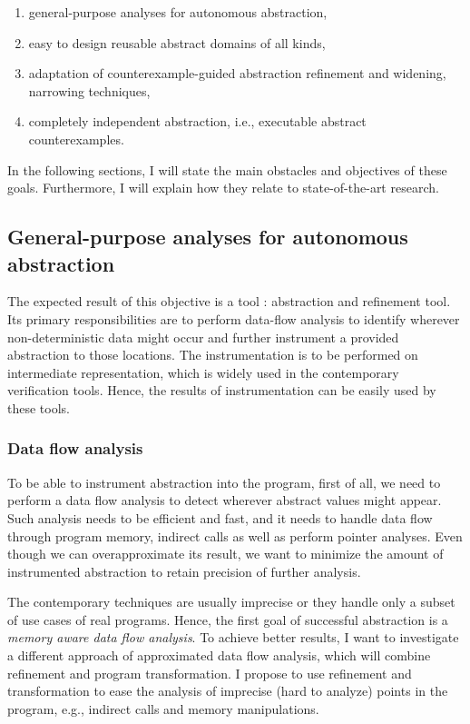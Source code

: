 \begin{enumerate}
    \item general-purpose analyses for autonomous abstraction,
    \item easy to design reusable abstract domains of all kinds,
    \item adaptation of counterexample-guided abstraction refinement and widening, narrowing techniques,
    \item completely independent abstraction, i.e., executable abstract counterexamples.
\end{enumerate}

\noindent
In the following sections, I will state the main obstacles and objectives of
these goals. Furthermore, I will explain how they relate to state-of-the-art
research.

\subsection{General-purpose analyses for autonomous abstraction}

The expected result of this objective is a tool \lart: \llvm abstraction and
refinement tool. Its primary responsibilities are to perform data-flow analysis
to identify wherever non-deterministic data might occur and further instrument
a provided abstraction to those locations.  The instrumentation is to be
performed on \llvm intermediate representation, which is widely used in the
contemporary verification tools. Hence, the results of instrumentation can be
easily used by these tools.

\subsubsection{Data flow analysis}

To be able to instrument abstraction into the program, first of all, we need to
perform a data flow analysis to detect wherever abstract values might appear.
Such analysis needs to be efficient and fast, and it needs to handle data flow
through program memory, indirect calls as well as perform pointer analyses. Even though we can
overapproximate its result, we want to minimize the amount of instrumented
abstraction to retain precision of further analysis.

The contemporary techniques are usually imprecise or they handle only a subset of use
cases of real programs. Hence, the first goal of successful abstraction is a
\emph{memory aware data flow analysis}. To achieve better results, I want to
investigate a different approach of approximated data flow analysis, which will
combine refinement and program transformation. I propose to use refinement
and transformation to ease the analysis of imprecise (hard to analyze) points
in the program, e.g., indirect calls and memory manipulations.

